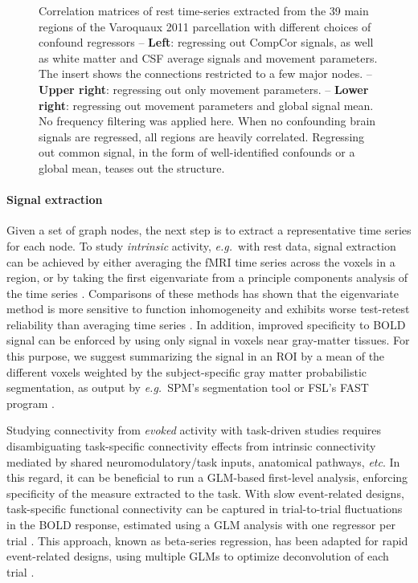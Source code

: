\documentclass[5p]{elsarticle}
\begin{document}
\begin{figure}
\caption{
Correlation matrices of rest time-series extracted from the 39 main
regions of the Varoquaux 2011 \cite{varoquaux2011} parcellation with
different choices of confound regressors -- 
\textbf{Left}: regressing out CompCor signals, as well as white matter and
CSF average signals and movement parameters. The insert shows the
connections restricted to a few major nodes.
-- \textbf{Upper right}: regressing out only movement parameters. -- 
\textbf{Lower right}:
regressing out movement parameters and global signal mean.
No frequency filtering was applied here.
\label{fig:correlation_matrices}
When no confounding brain signals are regressed, all regions are heavily
correlated. Regressing out common signal, in the form of well-identified
confounds or a global mean, teases out the structure.
}
\end{figure}

\paragraph{Signal extraction}
%
Given a set of graph nodes, the next step is to extract a representative time
series for each node.  To study \emph{intrinsic} activity, \emph{e.g.}\ with
rest data, signal extraction can be achieved by either averaging the fMRI time
series across the voxels in a region, or by taking the first eigenvariate from a
principle components analysis of the time series \cite{friston2006}.
Comparisons of these methods has shown that the eigenvariate method is
more sensitive to function inhomogeneity \cite{craddock2012} and exhibits worse
test-retest reliability than averaging time series \cite{zuo2010}. 
In addition, improved specificity to BOLD signal can be enforced
by using only signal in voxels near gray-matter tissues. For this purpose, we
suggest summarizing the signal in an ROI by a mean of the different voxels
weighted by the subject-specific gray matter probabilistic segmentation, 
as output by \emph{e.g.}\ SPM's segmentation tool \cite{ashburner2005} or
FSL's FAST program \cite{zhang2001}.

Studying connectivity from \emph{evoked} activity with task-driven studies 
requires disambiguating task-specific connectivity effects from
intrinsic connectivity mediated by shared neuromodulatory/task 
inputs, anatomical pathways, \emph{etc}. In this regard, it
can be beneficial to run a GLM-based first-level analysis, enforcing specificity
of the measure extracted to the task. With slow event-related designs,
task-specific functional connectivity can be captured in trial-to-trial
fluctuations in the BOLD response, estimated using a GLM analysis with one
regressor per trial \cite{grillon2012,rissman2004,mennes2010}. This approach,
known as beta-series regression, has been adapted for rapid event-related
designs, using multiple GLMs to optimize deconvolution of each trial
\cite{mumford2012}.
\end{document}
